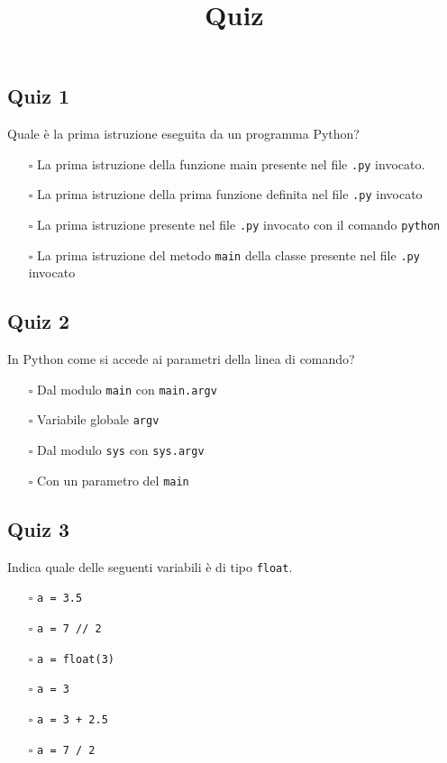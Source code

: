 \documentclass{article}
\title{Quiz}
\begin{document}
\pagestyle{fancy}
\fancyhf{}

\subsection*{Quiz 1}
Quale è la prima istruzione eseguita da un programma Python?
\begin{itemize}
  \item[$\square$] La prima istruzione della funzione main presente nel file \texttt{.py} invocato.
  \item[$\square$] La prima istruzione della prima funzione definita nel file \texttt{.py} invocato
  \item[$\square$] La prima istruzione presente nel file \texttt{.py} invocato con il comando \texttt{python}
  \item[$\square$] La prima istruzione del metodo \texttt{main} della classe presente nel file \texttt{.py} invocato
\end{itemize}
\subsection*{Quiz 2}
In Python come si accede ai parametri della linea di comando?
\begin{itemize}
  \item[$\square$] Dal modulo \texttt{main} con \texttt{main.argv}
  \item[$\square$] Variabile globale \texttt{argv}
  \item[$\square$] Dal modulo \texttt{sys} con \texttt{sys.argv}
  \item[$\square$] Con un parametro del \texttt{main}
\end{itemize}
\subsection*{Quiz 3}
Indica quale delle seguenti variabili è di tipo \texttt{float}.
\begin{itemize}
  \item[$\square$] \texttt{a = 3.5}
  \item[$\square$] \texttt{a = 7 // 2}
  \item[$\square$] \texttt{a = float(3)}
  \item[$\square$] \texttt{a = 3}
  \item[$\square$] \texttt{a = 3 + 2.5}
  \item[$\square$] \texttt{a = 7 / 2}
\end{itemize}
\end{document}
